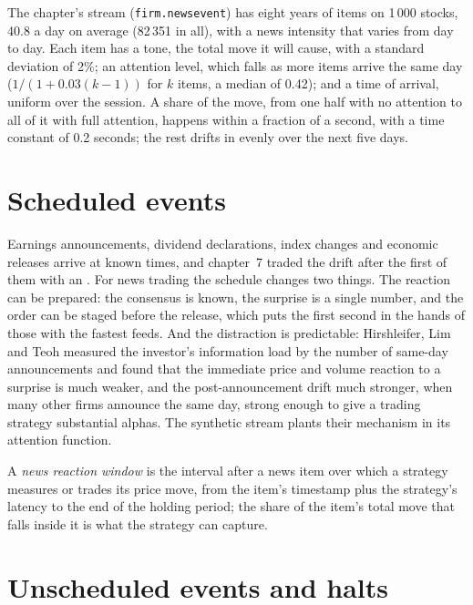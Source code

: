 The chapter's stream (\texttt{firm.newsevent}) has eight years of items on 1\,000 stocks, 40.8 a day on average (82\,351 in all), with a news intensity that
varies from day to day. Each item has a tone, the total move it will cause, with a standard deviation of 2\%; an attention level, which falls as more
items arrive the same day ($1/(1+0.03(k-1))$ for $k$ items, a median of 0.42); and a time of arrival, uniform over the session. A share of the move, from
one half with no attention to all of it with full attention, happens within a fraction of a second, with a time constant of 0.2 seconds; the rest drifts
in evenly over the next five days.

\section{Scheduled events}

Earnings announcements, dividend declarations, index changes and economic releases arrive at known times, and chapter~7 traded the drift after the first
of them with an . For news trading the schedule changes two things. The reaction can be prepared: the consensus is known, the surprise is a
single number, and the order can be staged before the release, which puts the first second in the hands of those with the fastest feeds. And the
distraction is predictable: Hirshleifer, Lim and Teoh measured the investor's information load by the number of same-day announcements and found that the
immediate price and volume reaction to a surprise is much weaker, and the post-announcement drift much stronger, when many other firms announce the same
day, strong enough to give a trading strategy substantial alphas. The synthetic stream plants their mechanism in its attention function.

\begin{definition}\label{def:s1:news-and-events:window}
A \emph{news reaction window} is the interval after a news item over which a strategy measures or trades its price move, from
the item's timestamp plus the strategy's latency to the end of the holding period; the share of the item's total move that falls inside it is what the
strategy can capture.
\end{definition}

\section{Unscheduled events and halts}

